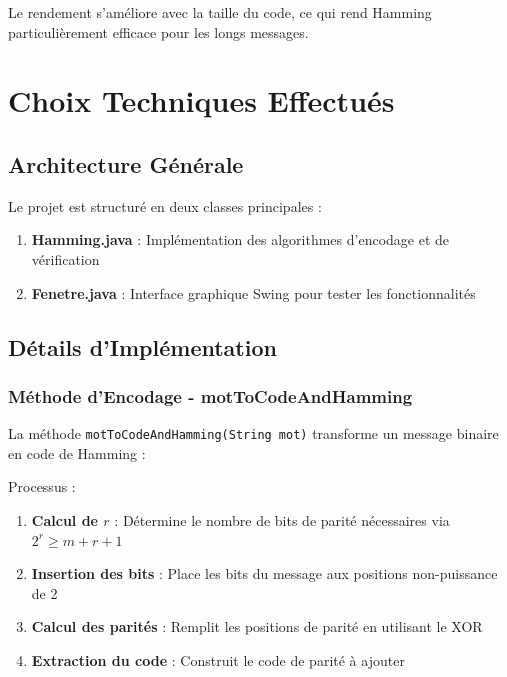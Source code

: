 \documentclass[12pt, a4paper]{article}
\begin{document}
Le rendement s'améliore avec la taille du code, ce qui rend Hamming particulièrement efficace pour les longs messages.

\section{Choix Techniques Effectués}

\subsection{Architecture Générale}

Le projet est structuré en deux classes principales :

\begin{enumerate}
    \item \textbf{Hamming.java} : Implémentation des algorithmes d'encodage et de vérification
    \item \textbf{Fenetre.java} : Interface graphique Swing pour tester les fonctionnalités
\end{enumerate}

\subsection{Détails d'Implémentation}

\subsubsection{Méthode d'Encodage - motToCodeAndHamming}

La méthode \texttt{motToCodeAndHamming(String mot)} transforme un message binaire en code de Hamming :



Processus :
\begin{enumerate}
    \item \textbf{Calcul de $r$} : Détermine le nombre de bits de parité nécessaires via $2^r \geq m + r + 1$
    \item \textbf{Insertion des bits} : Place les bits du message aux positions non-puissance de 2
    \item \textbf{Calcul des parités} : Remplit les positions de parité en utilisant le XOR
    \item \textbf{Extraction du code} : Construit le code de parité à ajouter
\end{enumerate}
\end{document}
